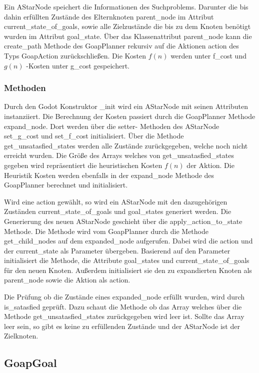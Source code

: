 Ein AStarNode speichert die Informationen des Suchproblems. Darunter die bis dahin erfüllten Zustände des Elternknoten parent\_node im Attribut current\_state\_of\_goals, sowie alle Zielzustände die bis zu dem Knoten benötigt wurden im Attribut goal\_state. Über das Klassenattribut parent\_node kann die create\_path Methode des GoapPlanner rekursiv auf die Aktionen action des Typs GoapAction zurückschließen. Die Kosten $f(n)$ werden unter f\_cost und $g(n)$ -Kosten unter g\_cost gespeichert.


\subsubsection{Methoden}

Durch den Godot Konstruktor \_init wird ein AStarNode mit seinen Attributen instanziiert. Die Berechnung der Kosten passiert durch die GoapPlanner Methode expand\_node. Dort werden über die setter- Methoden des AStarNode set\_g\_cost und set\_f\_cost initialisiert. Über die Methode get\_unsatasfied\_states werden alle Zustände zurückgegeben, welche noch nicht erreicht wurden. Die Größe des Arrays welches von get\_unsatasfied\_states gegeben wird repräsentiert die heuristischen Kosten $f(n)$ der Aktion. Die Heuristik Kosten werden ebenfalls in der expand\_node Methode des GoapPlanner berechnet und initialisiert.

Wird eine action gewählt, so wird ein AStarNode mit den dazugehörigen Zuständen current\_state\_of\_goals und goal\_states generiert werden. Die Generierung des neuen AStarNode geschieht über die apply\_action\_to\_state Methode. Die Methode wird vom GoapPlanner durch die Methode get\_child\_nodes auf dem expanded\_node aufgerufen. Dabei wird die action und der current\_state als Parameter übergeben. Basierend auf den Parameter initialisiert die Methode, die Attribute goal\_states und current\_state\_of\_goals für den neuen Knoten. Außerdem initialisiert sie den zu expandierten Knoten als parent\_node sowie die Aktion als action.

Die Prüfung ob die Zustände eines expanded\_node erfüllt wurden, wird durch is\_satasfied geprüft. Dazu schaut die Methode ob das Array welches über die Methode get\_unsatasfied\_states zurückgegeben wird leer ist. Sollte das Array leer sein, so gibt es keine zu erfüllenden Zustände und der AStarNode ist der Zielknoten.



\subsection{GoapGoal}

